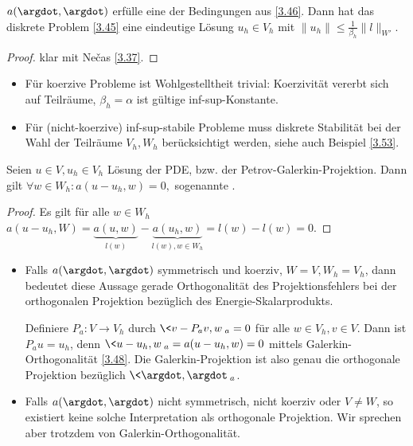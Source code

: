 \begin{st}[Wohlgestelltheit] \label{3.47}
	$a(\argdot, \argdot)$ erfülle eine der Bedingungen aus \ref{3.46}.
	Dann hat das diskrete Problem \ref{3.45} eine eindeutige Lösung $u_h \in V_h$ mit
	\begin{math}
		\|u_h\| \le \frac{1}{\beta_h} \|l\|_{W'}.
	\end{math}
	\begin{proof}
		klar mit Nečas \ref{3.37}.
	\end{proof}
	\begin{note}
		\begin{itemize}
			\item
				Für koerzive Probleme ist Wohlgestelltheit trivial:
				Koerzivität vererbt sich auf Teilräume, $\beta_h = \alpha$ ist gültige inf-sup-Konstante.
			\item
				Für (nicht-koerzive) inf-sup-stabile Probleme muss diskrete Stabilität bei der Wahl der Teilräume $V_h, W_h$ berücksichtigt werden, siehe auch Beispiel \ref{3.53}.
		\end{itemize}
	\end{note}
\end{st}

\begin{lem} \label{3.48}
	Seien $u \in V, u_h \in V_h$ Lösung der PDE, bzw. der Petrov-Galerkin-Projektion.
	Dann gilt
	\begin{math}
		\forall w \in W_h : a(u - u_h, w) = 0,
	\end{math}
	sogenannte .
	\begin{proof}
		Es gilt für alle $w \in W_h$
		\begin{math}
			a(u-u_h, W)
			= \underbrace{a(u, w)}_{l(w)} - \underbrace{a(u_h, w)}_{l(w), w \in W_h}
			= l(w) - l(w)
			= 0.
		\end{math}
	\end{proof}
	\begin{note}
		\begin{itemize}
			\item
				Falls $a(\argdot, \argdot)$ symmetrisch und koerziv, $W = V, W_h = V_h$, dann bedeutet diese Aussage gerade Orthogonalität des Projektionsfehlers bei der orthogonalen Projektion bezüglich des Energie-Skalarprodukts.

				Definiere $P_a: V \to V_h$ durch $\<v - P_a v, w\>_a = 0$ für alle $w \in V_h, v \in V$.
				Dann ist $P_a u = u_h$, denn $\<u - u_h, w\>_a = a(u - u_h, w) = 0$ mittels Galerkin-Orthogonalität \ref{3.48}.
				Die Galerkin-Projektion ist also genau die orthogonale Projektion bezüglich $\<\argdot, \argdot\>_a$.
			\item
				Falls $a(\argdot, \argdot)$ nicht symmetrisch, nicht koerziv oder $V \neq W$, so existiert keine solche Interpretation als orthogonale Projektion.
				Wir sprechen aber trotzdem von Galerkin-Orthogonalität.
		\end{itemize}
	\end{note}
\end{lem}

